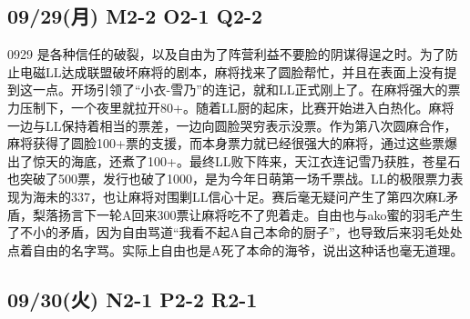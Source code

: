 \subsection{09/29(月) M2-2 O2-1 Q2-2}


0929 是各种信任的破裂，以及自由为了阵营利益不要脸的阴谋得逞之时。为了防止电磁LL达成联盟破坏麻将的剧本，麻将找来了圆脸帮忙，并且在表面上没有提到这一点。开场引领了“小衣-雪乃”的连记，就和LL正式刚上了。在麻将强大的票力压制下，一个夜里就拉开80+。随着LL厨的起床，比赛开始进入白热化。麻将一边与LL保持着相当的票差，一边向圆脸哭穷表示没票。作为第八次圆麻合作，麻将获得了圆脸100+票的支援，而本身票力就已经很强大的麻将，通过这些票爆出了惊天的海底，还煮了100+。最终LL败下阵来，天江衣连记雪乃获胜，苍星石也突破了500票，发行也破了1000，是为今年日萌第一场千票战。LL的极限票力表现为海未的337，也让麻将对围剿LL信心十足。赛后毫无疑问产生了第四次麻L矛盾，梨落扬言下一轮A回来300票让麻将吃不了兜着走。自由也与ako蜜的羽毛产生了不小的矛盾，因为自由骂道“我看不起A自己本命的厨子”，也导致后来羽毛处处点着自由的名字骂。实际上自由也是A死了本命的海爷，说出这种话也毫无道理。

\subsection{09/30(火) N2-1 P2-2 R2-1}

